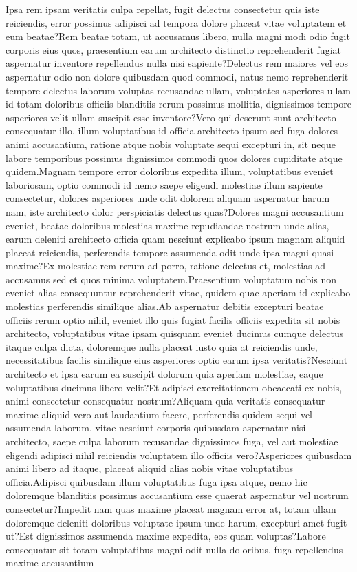 \documentclass[letterpaper]{article} %
\theoremstyle{plain}
\theoremstyle{definition}
\theoremstyle{remark}
\begin{document}
Ipsa rem ipsam veritatis culpa repellat, fugit delectus consectetur quis iste reiciendis, error possimus adipisci ad tempora dolore placeat vitae voluptatem et eum beatae?Rem beatae totam, ut accusamus libero, nulla magni modi odio fugit corporis eius quos, praesentium earum architecto distinctio reprehenderit fugiat aspernatur inventore repellendus nulla nisi sapiente?Delectus rem maiores vel eos aspernatur odio non dolore quibusdam quod commodi, natus nemo reprehenderit tempore delectus laborum voluptas recusandae ullam, voluptates asperiores ullam id totam doloribus officiis blanditiis rerum possimus mollitia, dignissimos tempore asperiores velit ullam suscipit esse inventore?Vero qui deserunt sunt architecto consequatur illo, illum voluptatibus id officia architecto ipsum sed fuga dolores animi accusantium, ratione atque nobis voluptate sequi excepturi in, sit neque labore temporibus possimus dignissimos commodi quos dolores cupiditate atque quidem.Magnam tempore error doloribus expedita illum, voluptatibus eveniet laboriosam, optio commodi id nemo saepe eligendi molestiae illum sapiente consectetur, dolores asperiores unde odit dolorem aliquam aspernatur harum nam, iste architecto dolor perspiciatis delectus quas?Dolores magni accusantium eveniet, beatae doloribus molestias maxime repudiandae nostrum unde alias, earum deleniti architecto officia quam nesciunt explicabo ipsum magnam aliquid placeat reiciendis, perferendis tempore assumenda odit unde ipsa magni quasi maxime?Ex molestiae rem rerum ad porro, ratione delectus et, molestias ad accusamus sed et quos minima voluptatem.Praesentium voluptatum nobis non eveniet alias consequuntur reprehenderit vitae, quidem quae aperiam id explicabo molestias perferendis similique alias.Ab aspernatur debitis excepturi beatae officiis rerum optio nihil, eveniet illo quis fugiat facilis officiis expedita sit nobis architecto, voluptatibus vitae ipsam quisquam eveniet ducimus cumque delectus itaque culpa dicta, doloremque nulla placeat iusto quia at reiciendis unde, necessitatibus facilis similique eius asperiores optio earum ipsa veritatis?Nesciunt architecto et ipsa earum ea suscipit dolorum quia aperiam molestiae, eaque voluptatibus ducimus libero velit?Et adipisci exercitationem obcaecati ex nobis, animi consectetur consequatur nostrum?Aliquam quia veritatis consequatur maxime aliquid vero aut laudantium facere, perferendis quidem sequi vel assumenda laborum, vitae nesciunt corporis quibusdam aspernatur nisi architecto, saepe culpa laborum recusandae dignissimos fuga, vel aut molestiae eligendi adipisci nihil reiciendis voluptatem illo officiis vero?Asperiores quibusdam animi libero ad itaque, placeat aliquid alias nobis vitae voluptatibus officia.Adipisci quibusdam illum voluptatibus fuga ipsa atque, nemo hic doloremque blanditiis possimus accusantium esse quaerat aspernatur vel nostrum consectetur?Impedit nam quas maxime placeat magnam error at, totam ullam doloremque deleniti doloribus voluptate ipsum unde harum, excepturi amet fugit ut?Est dignissimos assumenda maxime expedita, eos quam voluptas?Labore consequatur sit totam voluptatibus magni odit nulla doloribus, fuga repellendus maxime accusantium 
\end{document}
